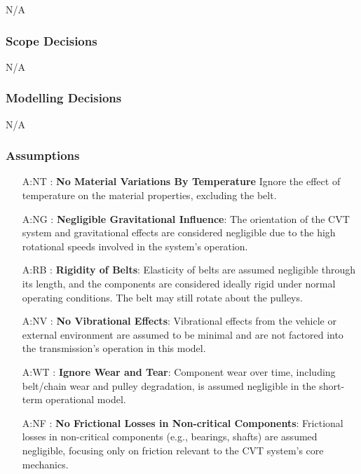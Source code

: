 \documentclass[12pt]{article}
\begin{document}
N/A

\subsubsection{Scope Decisions}

N/A
\subsubsection{Modelling Decisions}

N/A

\subsubsection{Assumptions} \label{sec_assumpt}

\begin{itemize}

\item[A:NT \label{A:NT}:]
\textbf{No Material Variations By Temperature } Ignore the effect of temperature on the material properties, excluding the belt.

\item[A:NG \label{A:NG}:]
\textbf{Negligible Gravitational Influence}: The orientation of the CVT system and gravitational effects are considered negligible due to the high rotational speeds involved in the system's operation.

\item[A:RB \label{A:RB}:]
\textbf{Rigidity of Belts}: Elasticity of belts are assumed negligible through its length, and the components are considered ideally rigid under normal operating conditions. The belt may still rotate about the pulleys.

\item[A:NV \label{A:NV}:]
\textbf{No Vibrational Effects}: Vibrational effects from the vehicle or external environment are assumed to be minimal and are not factored into the transmission’s operation in this model.

\item[A:WT \label{A:WT}:]
\textbf{Ignore Wear and Tear}: Component wear over time, including belt/chain wear and pulley degradation, is assumed negligible in the short-term operational model.

\item[A:NF \label{A:NF}:]
\textbf{No Frictional Losses in Non-critical Components}: Frictional losses in non-critical components (e.g., bearings, shafts) are assumed negligible, focusing only on friction relevant to the CVT system's core mechanics.


\end{itemize}
\end{document}

